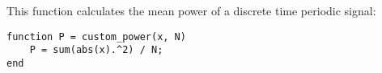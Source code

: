 
\item[(d)]
This function calculates the mean power of a discrete time periodic signal:

\begin{verbatim}
function P = custom_power(x, N)
    P = sum(abs(x).^2) / N;
end
\end{verbatim}
